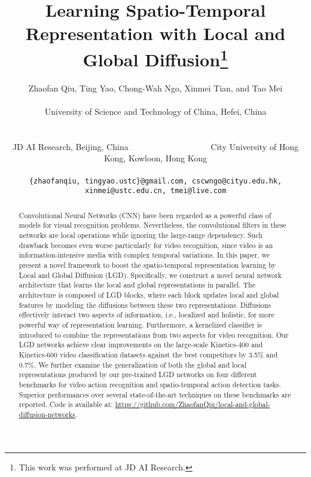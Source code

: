 \documentclass[10pt,twocolumn,letterpaper]{article}
\begin{document}
\title{Learning Spatio-Temporal Representation with Local and Global Diffusion\thanks{{\small This work was performed at JD AI Research.}}}

\author{Zhaofan Qiu, Ting Yao, Chong-Wah Ngo, Xinmei Tian, and Tao Mei\\
\parbox{20em}{\small\centering  University of Science and Technology of China, Hefei, China}\\
\parbox{40em}{\small\centering  JD AI Research, Beijing, China~~~~~~~~~~~~~~~~~~~ City University of Hong Kong, Kowloon, Hong Kong}\\
{\tt\small \{zhaofanqiu, tingyao.ustc\}@gmail.com, cscwngo@cityu.edu.hk, xinmei@ustc.edu.cn, tmei@live.com}
}

\maketitle
\thispagestyle{empty}

\begin{abstract}
Convolutional Neural Networks (CNN) have been regarded as a powerful class of models for visual recognition problems. Nevertheless, the convolutional filters in these networks are local operations while ignoring the large-range dependency. Such drawback becomes even worse particularly for video recognition, since video is an information-intensive media with complex temporal variations. In this paper, we present a novel framework to boost the spatio-temporal representation learning by Local and Global Diffusion (LGD). Specifically, we construct a novel neural network architecture that learns the local and global representations in parallel. The architecture is composed of LGD blocks, where each block updates local and global features by modeling the diffusions between these two representations. Diffusions effectively interact two aspects of information, i.e., localized and holistic, for more powerful way of representation learning. Furthermore, a kernelized classifier is introduced to combine the representations from two aspects for video recognition. Our LGD networks achieve clear improvements on the large-scale Kinetics-400 and Kinetics-600 video classification datasets against the best competitors by 3.5\% and 0.7\%. We further examine the generalization of both the global and local representations produced by our pre-trained LGD networks on four different benchmarks for video action recognition and spatio-temporal action detection tasks. Superior performances over several state-of-the-art techniques on these benchmarks are reported. Code is available at: \url{https://github.com/ZhaofanQiu/local-and-global-diffusion-networks}.
\end{abstract}
\end{document}

